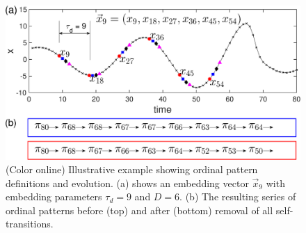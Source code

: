 \documentclass[12pt,aip,cha,reprint,nofootinbib]{revtex4-1}
\begin{document}
\begin{figure}
	\centering
	\includegraphics[width=1.3\columnwidth]{timeseriesOPexample.eps}
\caption{(Color online) Illustrative example showing ordinal pattern definitions and evolution. (a) shows an embedding vector $\vec{x}_{9}$ with embedding parameters $\tau_d = 9$ and $D = 6$. (b) The resulting series of ordinal patterns before (top) and after (bottom) removal of all self-transitions. \label{fig:OPexample}}
\end{figure}
\end{document}
